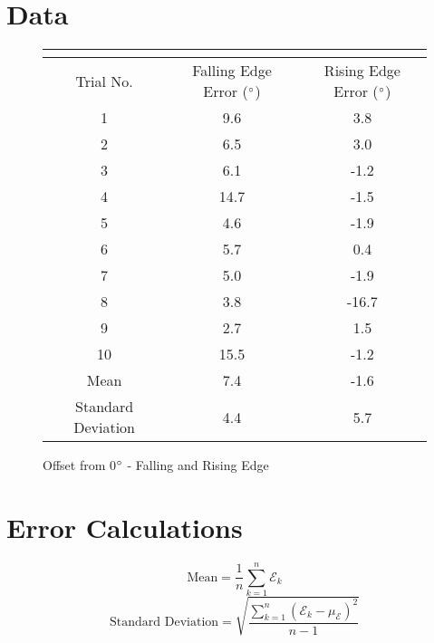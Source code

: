 \documentclass[11pt]{article}
\begin{document}
\section{Data}
\begin{figure}[h!t]
\begin{center}
\caption{Offset from 0$\degree$ - Falling and Rising Edge}
\begin{tabular}{| c | c | c |}
\multicolumn{3}{c}{} \\ \hline
\rowcolor{dblue}
Trial No. & Falling Edge Error ($\degree$) & Rising Edge Error ($\degree$) \\ \hline
1 & 9.6 & 3.8 \\ \hline
2 & 6.5 & 3.0 \\ \hline
3 & 6.1 & -1.2 \\ \hline
4 & 14.7 & -1.5 \\ \hline
5 & 4.6 & -1.9 \\ \hline
6 & 5.7 & 0.4 \\ \hline
7 & 5.0 & -1.9 \\ \hline
8 & 3.8 & -16.7 \\ \hline
9 & 2.7 & 1.5 \\ \hline
10 & 15.5 & -1.2 \\ \hline
\rowcolor{lyellow}
Mean & 7.4 & -1.6 \\\hline
\rowcolor{lred}
Standard Deviation & 4.4 & 5.7 \\ \hline
\end{tabular}
\end{center}
\end{figure}
\section{Error Calculations}
\begin{equation}
	\mbox{Mean} = \frac{1}{n} \sum_{k=1}^{n}\mathcal{E}_k
\end{equation}
\begin{equation}
	\mbox{Standard Deviation} = \sqrt{\frac{\sum_{k=1}^{n}(\mathcal{E}_k-\mu_{\mathcal{E}})^2}{n-1}}
\end{equation}
\end{document}
